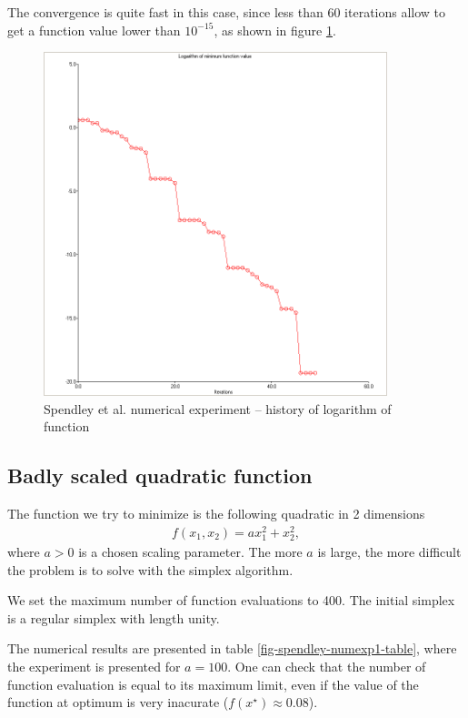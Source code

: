 The convergence is quite fast in this case, since less than 60 iterations
allow to get a function value lower than $10^{-15}$, as shown in 
figure \ref{fig-spendley-numexp1-logfopt}.

\begin{figure}
\begin{center}
\includegraphics[width=10cm]{quad2bis-spendley-history-logfopt.png}
\end{center}
\caption{Spendley et al. numerical experiment -- history of logarithm of function}
\label{fig-spendley-numexp1-logfopt}
\end{figure}

\subsection{Badly scaled quadratic function}

The function we try to minimize is the following quadratic 
in 2 dimensions 
\begin{eqnarray}
\label{quadratic-sp-function2}
f(x_1,x_2) = a x_1^2 + x_2^2,
\end{eqnarray}
where $a>0$ is a chosen scaling parameter. 
The more $a$ is large, the more difficult the problem is 
to solve with the simplex algorithm.

We set the maximum number of function evaluations to 400.
The initial simplex is a regular simplex with length unity.

The numerical results are presented in table \ref{fig-spendley-numexp1-table},
where the experiment is presented for $a=100$. One can check that the 
number of function evaluation is equal to its maximum limit, even if the value of the 
function at optimum is very inacurate ($f(x^\star) \approx 0.08$).

